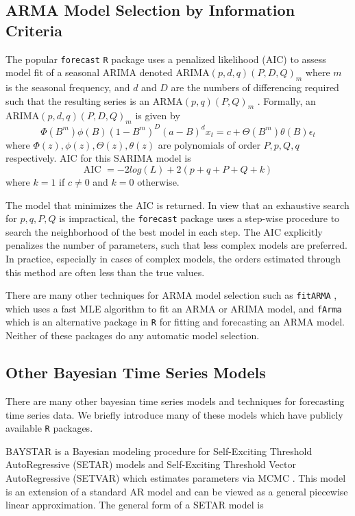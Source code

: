 \subsection{ARMA Model Selection by Information Criteria}

The popular {\tt forecast} {\tt R}  package uses a penalized likelihood (AIC) to assess model fit of a seasonal ARIMA denoted ARIMA$(p,d,q)(P,D,Q)_{m}$ where $m$ is the seasonal frequency, and $d$ and $D$ are the numbers of differencing required such that the resulting series is an ARMA$(p,q)(P,Q)_{m}$ \cite{hyndman2008}. Formally, an ARIMA$(p,d,q)(P,D,Q)_{m}$ is given by
$$\Phi(B^m)\phi(B)(1-B^m)^D(a-B)^dx_t = c+\Theta(B^m)\theta(B)\epsilon_t$$
where $\Phi(z),\phi(z),\Theta(z),\theta(z)$ are polynomials of order $P,p,Q,q$ respectively.
AIC for this SARIMA model is 
$$\text{AIC } = -2log(L)+2(p+q+P+Q+k)$$
where $k=1$ if $c\neq0$ and $k=0$ otherwise.

The model that minimizes the AIC is returned. In view that an exhaustive search for $p,q,P,Q$ is impractical, the {\tt forecast} package uses a step-wise procedure to search the neighborhood of the best model in each step. The AIC explicitly penalizes the number of parameters, such that less complex models are preferred. In practice, especially in cases of complex models, the orders estimated through this method are often less than the true values.

There are many other techniques for ARMA model selection such as {\tt fitARMA} \cite{fitARMA2007}, which uses a fast MLE algorithm to fit an ARMA or ARIMA model,  and {\tt fArma} \cite{fArma2013} which is an alternative package in {\tt R} for fitting and forecasting an ARMA model.  Neither of these packages do any automatic model selection.

\subsection{Other Bayesian Time Series Models}
There are many other bayesian time series models and techniques for forecasting time series data.  We briefly introduce many of these models which have publicly available {\tt R} packages.  

BAYSTAR is a Bayesian modeling procedure for Self-Exciting Threshold AutoRegressive (SETAR) models and Self-Exciting Threshold Vector AutoRegressive (SETVAR) which estimates parameters via MCMC \cite{BAYSTAR2013}.  This model is an extension of a standard AR model and can be viewed as a general piecewise linear approximation.  The general form of a SETAR model is 

